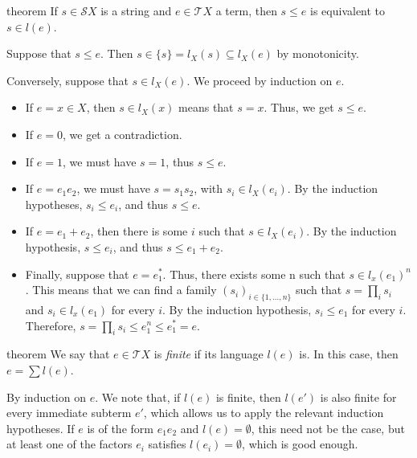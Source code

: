 \documentclass[a4paper,UKenglish,cleveref, autoref, thm-restate]{lipics-v2021}
\begin{document}
\begin{theoremEnd}{theorem}
  \label{thm:membership-characterization}
  If $s \in \mathcal{S}X$ is a string and $e \in \mathcal{T}X$ a term, then
  $s \leq e$ is equivalent to $s \in l(e)$.
\end{theoremEnd}

\begin{proofEnd}
  Suppose that $s  \leq  e$.  Then $s  \in  \{s\} = l_X(s)  \subseteq  l_X(e)$ by monotonicity.

  Conversely, suppose that $s  \in  l_X(e)$. We proceed by induction on $e$.
  \begin{itemize}
  \item If $e = x  \in  X$, then $s  \in  l_X(x)$ means that $s = x$.  Thus, we get
    $s  \leq  e$.
  \item If $e = 0$, we get a contradiction.
  \item If $e = 1$, we must have $s = 1$, thus $s  \leq  e$.
  \item If $e = e_{1}e_{2}$, we must have $s = s_{1}s_{2}$, with $s_i  \in  l_X(e_i)$.  By the
    induction hypotheses, $s_i  \leq  e_i$, and thus $s  \leq  e$.
  \item If $e = e_{1} + e_{2}$, then there is some $i$ such that $s  \in  l_X(e_i)$.  By
    the induction hypothesis, $s  \leq  e_i$, and thus $s  \leq  e_{1} + e_{2}$.
  \item Finally, suppose that $e = e_{1}^*$.  Thus, there exists some n such that
    $s  \in  l_x(e_{1})^n$.  This means that we can find a family
    $(s_i)_{i  \in  \{1, \ldots ,n\}}$ such that $s =  \prod _i s_i$ and $s_i  \in  l_x(e_{1})$ for
    every $i$.  By the induction hypothesis, $s_i  \leq  e_{1}$ for every $i$.
    Therefore, $s =  \prod _i s_i  \leq  e_{1}^n  \leq  e_{1}^* = e$.
  \end{itemize}
\end{proofEnd}

\begin{theoremEnd}{theorem}
  \label{thm:finite-term}
  We say that $e  \in  \mathcal{T}X$ is \emph{finite} if its language $l(e)$ is. In
  this case, then $e =  \sum  l(e)$.
\end{theoremEnd}

\begin{proofEnd}
  By induction on $e$. We note that, if $l(e)$ is finite, then $l(e')$ is also
  finite for every immediate subterm $e'$, which allows us to apply the relevant
  induction hypotheses.  If $e$ is of the form $e_1e_2$ and $l(e) =  \emptyset $, this
  need not be the case, but at least one of the factors $e_i$ satisfies
  $l(e_i) =  \emptyset $, which is good enough.
\end{proofEnd}
\end{document}
